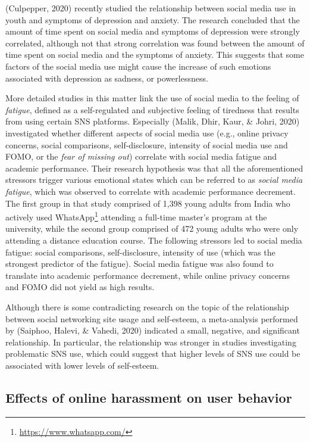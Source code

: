 \documentclass[10pt,dvipsnames]{scrartcl}
\begin{document}
(Culpepper, 2020) recently studied the relationship between social media
use in youth and symptoms of depression and anxiety. The research
concluded that the amount of time spent on social media and symptoms of
depression were strongly correlated, although not that strong
correlation was found between the amount of time spent on social media
and the symptoms of anxiety. This suggests that some factors of the
social media use might cause the increase of such emotions associated
with depression as sadness, or powerlessness.

More detailed studies in this matter link the use of social media to the
feeling of \textit{fatigue}, defined as a self-regulated and subjective
feeling of tiredness that results from using certain SNS platforms.
Especially (Malik, Dhir, Kaur, \& Johri, 2020) investigated whether
different aspects of social media use (e.g., online privacy concerns,
social comparisons, self-disclosure, intensity of social media use and
FOMO, or the \textit{fear of missing out}) correlate with social media
fatigue and academic performance. Their research hypothesis was that all
the aforementioned stressors trigger various emotional states which can
be referred to as \textit{social media fatigue}, which was observed to
correlate with academic performance decrement. The first group in that
study comprised of 1,398 young adults from India who actively used
WhatsApp\footnote{\url{https://www.whatsapp.com/}} attending a full-time
master's program at the university, while the second group comprised of
472 young adults who were only attending a distance education course.
The following stressors led to social media fatigue: social comparisons,
self-disclosure, intensity of use (which was the strongest predictor of
the fatigue). Social media fatigue was also found to translate into
academic performance decrement, while online privacy concerns and FOMO
did not yield as high results.

Although there is some contradicting research on the topic of the
relationship between social networking site usage and self-esteem, a
meta-analysis performed by (Saiphoo, Halevi, \& Vahedi, 2020) indicated
a small, negative, and significant relationship. In particular, the
relationship was stronger in studies investigating problematic SNS use,
which could suggest that higher levels of SNS use could be associated
with lower levels of self-esteem.

\subsection{Effects of online harassment on user behavior}
\end{document}
